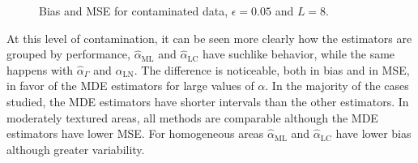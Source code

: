 \documentclass[twocolumn]{svjour3}
\begin{document}
\begin{figure}[htb]
	\centering
	\caption{\label{SesgoyECMConContL=8}\small Bias and MSE for contaminated data,  $\epsilon=0.05$ and $ L=8$.}
\end{figure}


At this level of contamination, it can be seen more clearly how the estimators are grouped by performance, $\widehat{\alpha}_{\text{{ML}}}$ and $\widehat{\alpha}_{\text{{LC}}}$ have suchlike behavior, while the same happens with $\widehat{\alpha}_{\Gamma}$ and $\widehat{\alpha}_{\text{{LN}}}$.  
The difference is noticeable, both in bias and in MSE, in favor of the MDE estimators for large values of $\alpha$. 
In the majority of the cases studied, the MDE estimators have shorter intervals than the other estimators. 
In moderately textured areas, all methods are comparable although the MDE estimators have lower MSE. 
For homogeneous areas $\widehat{\alpha}_{\text{{ML}}}$ and $\widehat{\alpha}_{\text{{LC}}}$ have lower bias although greater variability.
\end{document}
